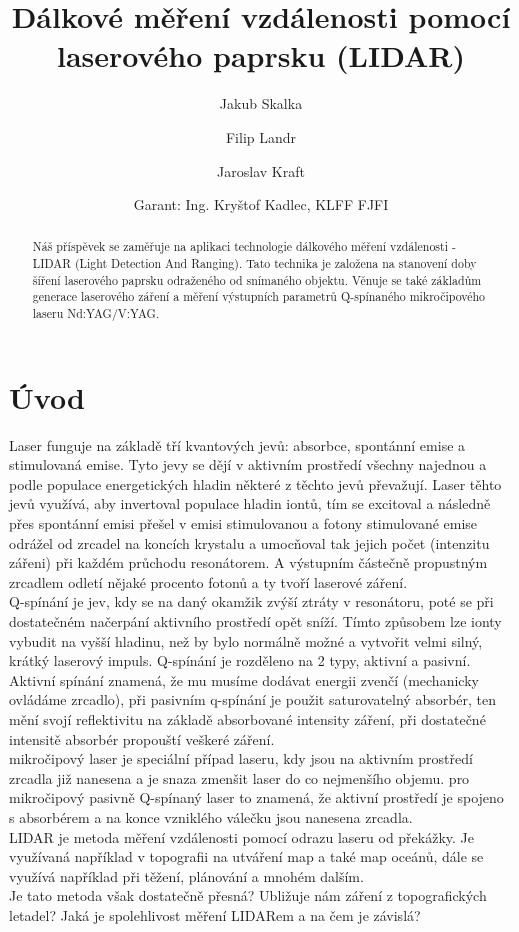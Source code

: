 \documentclass[12pt,a4paper]{article}
\title{Dálkové měření vzdálenosti pomocí laserového paprsku (LIDAR)}
\author[1]{Jakub Skalka}
\author[2]{Filip Landr}
\author[3]{Jaroslav Kraft}
\date{\small Garant: Ing. Kryštof Kadlec, KLFF FJFI\vspace{-2em}} %
\affil[1]{Gymnázium, České Budějovice, Jírovcova 8; skalkaj@jirovcovka.net}
\affil[2]{Gymnázium, Praha 5, Nad Kavalírkou 100/1; fi.landr@seznam.cz}
\affil[3]{Gymnázium, Příbram, Legionářů 402; kraft.jarda@gmail.com\vspace{-1em}} %
\begin{document}
\maketitle \thispagestyle{empty}

\begin{abstract} \noindent
    Náš příspěvek se zaměřuje na aplikaci technologie dálkového měření vzdálenosti - LIDAR (Light Detection And Ranging). Tato technika je založena na stanovení doby šíření laserového paprsku odraženého od snímaného objektu. Věnuje se také základům generace laserového záření a měření výstupních parametrů Q-spínaného mikročipového laseru Nd:YAG/V:YAG.\end{abstract}


\section{Úvod}
Laser funguje na základě tří kvantových jevů: absorbce, spontánní emise a stimulovaná emise. Tyto jevy se dějí v aktivním prostředí všechny najednou a podle populace energetických hladin některé z těchto jevů převažují. Laser těhto jevů využívá, aby invertoval populace hladin iontů, tím se excitoval a následně přes spontánní emisi přešel v emisi stimulovanou a fotony stimulované emise odrážel od zrcadel na koncích krystalu a umocňoval tak jejich počet (intenzitu zářeni) při každém průchodu resonátorem. A výstupním částečně propustným zrcadlem odletí nějaké procento fotonů a ty tvoří laserové záření.
\\Q-spínání je jev, kdy se na daný okamžik zvýší ztráty v resonátoru, poté se při dostatečném načerpání aktivního prostředí opět sníží. Tímto způsobem lze ionty vybudit na vyšší hladinu, než by bylo normálně možné a vytvořit velmi silný, krátký laserový impuls. Q-spínání je rozděleno na 2 typy, aktivní a pasivní. Aktivní spínání znamená, že mu musíme dodávat energii zvenčí (mechanicky ovládáme zrcadlo), při pasivním q-spínání je použit saturovatelný absorbér, ten mění svojí reflektivitu na základě absorbované intensity záření, při dostatečné intensitě absorbér propouští veškeré záření.
\\mikročipový laser je speciální případ laseru, kdy jsou na aktivním prostředí zrcadla již nanesena a je snaza zmenšit laser do co nejmenšího objemu. pro mikročipový pasivně Q-spínaný laser to znamená, že aktivní prostředí je spojeno s absorbérem a na konce vzniklého válečku jsou nanesena zrcadla.
\\LIDAR je metoda měření vzdálenosti pomocí odrazu laseru od překážky. Je využívaná například v topografii na utváření map a také map oceánů, dále se využívá například při těžení, plánování a mnohém dalším.
\\Je tato metoda však dostatečně přesná? Ubližuje nám záření z topografických letadel? Jaká je spolehlivost měření LIDARem a na čem je závislá?
\end{document}
